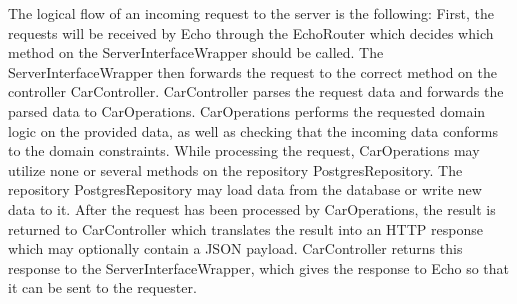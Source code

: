 The logical flow of an incoming request to the server is the following: First, the requests
will be received by Echo through the EchoRouter which decides which method on
the ServerInterfaceWrapper should be called. The ServerInterfaceWrapper then
forwards the request to the correct method on the controller CarController.
CarController parses the request data and forwards the parsed data to
CarOperations. CarOperations performs the requested domain logic on the
provided data, as well as checking that the incoming data conforms to the
domain constraints. While processing the request, CarOperations may utilize
none or several methods on the repository PostgresRepository. The repository
PostgresRepository may load data from the database or write new data to it. After
the request has been processed by CarOperations, the result is returned to
CarController which translates the result into an HTTP response which may
optionally contain a JSON payload. CarController returns this response to the
ServerInterfaceWrapper, which gives the response to Echo so that it can be sent
to the requester.

